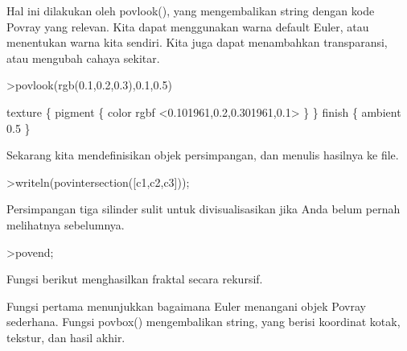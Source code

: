 \documentclass{article}
\begin{document}
\begin{eulernotebook}
\begin{eulercomment}
\begin{eulercomment}
\begin{eulercomment}
\begin{eulercomment}
\begin{eulercomment}
\begin{eulercomment}
\begin{eulercomment}
\begin{eulercomment}
\begin{eulercomment}
\begin{eulercomment}
\begin{eulercomment}
\begin{eulercomment}
\begin{eulercomment}
\begin{eulercomment}
\begin{eulercomment}
\begin{eulercomment}
\begin{eulercomment}
Hal ini dilakukan oleh povlook(), yang mengembalikan string dengan
kode Povray yang relevan. Kita dapat menggunakan warna default Euler,
atau menentukan warna kita sendiri. Kita juga dapat menambahkan
transparansi, atau mengubah cahaya sekitar.
\end{eulercomment}
\begin{eulerprompt}
>povlook(rgb(0.1,0.2,0.3),0.1,0.5)
\end{eulerprompt}
\begin{euleroutput}
   texture \{ pigment \{ color rgbf <0.101961,0.2,0.301961,0.1> \}  \} 
   finish \{ ambient 0.5 \} 
  
\end{euleroutput}
\begin{eulercomment}
Sekarang kita mendefinisikan objek persimpangan, dan menulis hasilnya
ke file.
\end{eulercomment}
\begin{eulerprompt}
>writeln(povintersection([c1,c2,c3]));
\end{eulerprompt}
\begin{eulercomment}
Persimpangan tiga silinder sulit untuk divisualisasikan jika Anda
belum pernah melihatnya sebelumnya.
\end{eulercomment}
\begin{eulerprompt}
>povend;
\end{eulerprompt}
\begin{eulercomment}
Fungsi berikut menghasilkan fraktal secara rekursif.

Fungsi pertama menunjukkan bagaimana Euler menangani objek Povray
sederhana. Fungsi povbox() mengembalikan string, yang berisi koordinat
kotak, tekstur, dan hasil akhir.


\end{eulercomment}
\end{eulercomment}
\end{eulercomment}
\end{eulercomment}
\end{eulercomment}
\end{eulercomment}
\end{eulercomment}
\end{eulercomment}
\end{eulercomment}
\end{eulercomment}
\end{eulercomment}
\end{eulercomment}
\end{eulercomment}
\end{eulercomment}
\end{eulercomment}
\end{eulercomment}
\end{eulercomment}
\end{eulernotebook}
\end{document}
